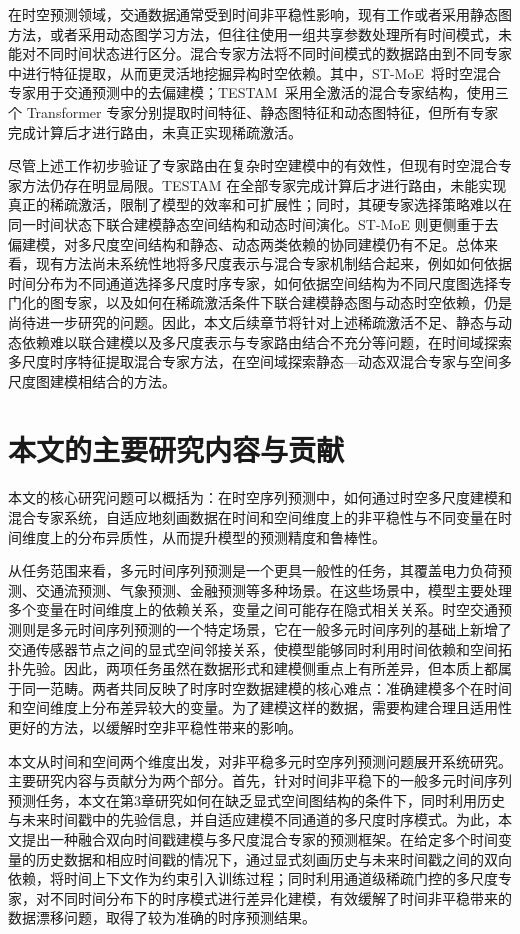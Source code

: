 在时空预测领域，交通数据通常受到时间非平稳性影响，现有工作或者采用静态图方法，或者采用动态图学习方法，但往往使用一组共享参数处理所有时间模式，未能对不同时间状态进行区分。混合专家方法将不同时间模式的数据路由到不同专家中进行特征提取，从而更灵活地挖掘异构时空依赖。其中，ST-MoE~\cite{st-moe}将时空混合专家用于交通预测中的去偏建模；TESTAM~\cite{testam}采用全激活的混合专家结构，使用三个 Transformer 专家分别提取时间特征、静态图特征和动态图特征，但所有专家完成计算后才进行路由，未真正实现稀疏激活。

尽管上述工作初步验证了专家路由在复杂时空建模中的有效性，但现有时空混合专家方法仍存在明显局限。TESTAM 在全部专家完成计算后才进行路由，未能实现真正的稀疏激活，限制了模型的效率和可扩展性；同时，其硬专家选择策略难以在同一时间状态下联合建模静态空间结构和动态时间演化。ST-MoE 则更侧重于去偏建模，对多尺度空间结构和静态、动态两类依赖的协同建模仍有不足。总体来看，现有方法尚未系统性地将多尺度表示与混合专家机制结合起来，例如如何依据时间分布为不同通道选择多尺度时序专家，如何依据空间结构为不同尺度图选择专门化的图专家，以及如何在稀疏激活条件下联合建模静态图与动态时空依赖，仍是尚待进一步研究的问题。因此，本文后续章节将针对上述稀疏激活不足、静态与动态依赖难以联合建模以及多尺度表示与专家路由结合不充分等问题，在时间域探索多尺度时序特征提取混合专家方法，在空间域探索静态—动态双混合专家与空间多尺度图建模相结合的方法。

\section{本文的主要研究内容与贡献}

本文的核心研究问题可以概括为：在时空序列预测中，如何通过时空多尺度建模和混合专家系统，自适应地刻画数据在时间和空间维度上的非平稳性与不同变量在时间维度上的分布异质性，从而提升模型的预测精度和鲁棒性。

从任务范围来看，多元时间序列预测是一个更具一般性的任务，其覆盖电力负荷预测、交通流预测、气象预测、金融预测等多种场景。在这些场景中，模型主要处理多个变量在时间维度上的依赖关系，变量之间可能存在隐式相关关系。时空交通预测则是多元时间序列预测的一个特定场景，它在一般多元时间序列的基础上新增了交通传感器节点之间的显式空间邻接关系，使模型能够同时利用时间依赖和空间拓扑先验。因此，两项任务虽然在数据形式和建模侧重点上有所差异，但本质上都属于同一范畴。两者共同反映了时序时空数据建模的核心难点：准确建模多个在时间和空间维度上分布差异较大的变量。为了建模这样的数据，需要构建合理且适用性更好的方法，以缓解时空非平稳性带来的影响。

本文从时间和空间两个维度出发，对非平稳多元时空序列预测问题展开系统研究。主要研究内容与贡献分为两个部分。首先，针对时间非平稳下的一般多元时间序列预测任务，本文在第3章研究如何在缺乏显式空间图结构的条件下，同时利用历史与未来时间戳中的先验信息，并自适应建模不同通道的多尺度时序模式。为此，本文提出一种融合双向时间戳建模与多尺度混合专家的预测框架。在给定多个时间变量的历史数据和相应时间戳的情况下，通过显式刻画历史与未来时间戳之间的双向依赖，将时间上下文作为约束引入训练过程；同时利用通道级稀疏门控的多尺度专家，对不同时间分布下的时序模式进行差异化建模，有效缓解了时间非平稳带来的数据漂移问题，取得了较为准确的时序预测结果。


